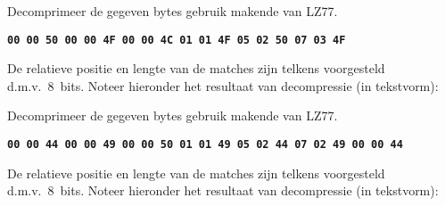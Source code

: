 \documentclass[]{pvm-exam}
\newcommand{\hex}[1]{\texttt{\bfseries #1}}
\begin{document}
\begin{question}
  Decomprimeer de gegeven bytes gebruik makende van LZ77.
  \begin{center}
    \hex{00 00 50 00 00 4F 00 00 4C 01 01 4F 05 02 50 07 03 4F}
  \end{center}
  De relatieve positie en lengte van de matches zijn telkens voorgesteld d.m.v.~8~bits.
  Noteer hieronder het resultaat van decompressie (in tekstvorm):
  \vskip5mm
  \begin{center}
  \end{center}
\end{question}

\begin{question}
  Decomprimeer de gegeven bytes gebruik makende van LZ77.
  \begin{center}
    \hex{00 00 44 00 00 49 00 00 50 01 01 49 05 02 44 07 02 49 00 00 44}
  \end{center}
  De relatieve positie en lengte van de matches zijn telkens voorgesteld d.m.v.~8~bits.
  Noteer hieronder het resultaat van decompressie (in tekstvorm):
  \vskip5mm
  \begin{center}
  \end{center}
\end{question}
\end{document}
